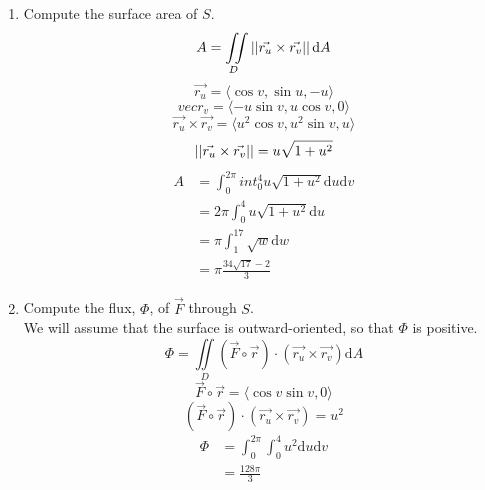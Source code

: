 \begin{enumerate}
\begin{enumerate}[label=\alph*.]
		\item Compute the surface area of $S$.\\
		\begin{equation*}
			A = \iint\limits_{D}{\left|\left|\vec{r_u} \times \vec{r_v}\right|\right|\mathrm{d}A}	
		\end{equation*}
		\begin{equation*}
			\vec{r_u} = \langle \cos{v}, \sin{u}, -u \rangle	
		\end{equation*}
		\begin{equation*}
			vec{r_v} = \langle -u\sin{v}, u\cos{v}, 0 \rangle	
		\end{equation*}
		\begin{equation*}
			\vec{r_u} \times \vec{r_v} = \langle u^2\cos{v}, u^2\sin{v}, u\rangle	
		\end{equation*}
		\begin{equation*}
			\left|\left|\vec{r_u} \times \vec{r_v}\right|\right| = u\sqrt{1 + u^2}	
		\end{equation*}
		\begin{align*}
			A &= \int_{0}^{2\pi}{int_{0}^{4}{u\sqrt{1 + u^2}\mathrm{d}u}\mathrm{d}v} \\
			&= 2\pi\int_{0}^{4}{u\sqrt{1 + u^2}\mathrm{d}u} \\
			&= \pi\int_{1}^{17}{\sqrt{w}\mathrm{d}w} \\
			&= \pi\frac{34\sqrt{17} - 2}{3}		
		\end{align*}
		
		\item Compute the flux, $\Phi$, of $\vec{F}$ through $S$.\\
		We will assume that the surface is outward-oriented, so that $\Phi$ is positive.
		\begin{equation*}
			\Phi = \iint\limits_{D}{\left(\vec{F}\circ\vec{r}\right) \cdot \left(\vec{r_u} \times \vec{r_v}\right)\mathrm{d}A}	
		\end{equation*}
		\begin{equation*}
			\vec{F}\circ\vec{r} = \langle \cos{v}\sin{v}, 0 \rangle
		\end{equation*}
		\begin{equation*}
			\left(\vec{F}\circ\vec{r}\right) \cdot \left(\vec{r_u} \times \vec{r_v}\right) = u^2	
		\end{equation*}
		\begin{align*}
			\Phi &= \int_{0}^{2\pi}{\int_{0}^{4}{u^2\mathrm{d}u}\mathrm{d}v} \\
			&= \frac{128\pi}{3}
		\end{align*}
	\end{enumerate}
	

\end{enumerate}

